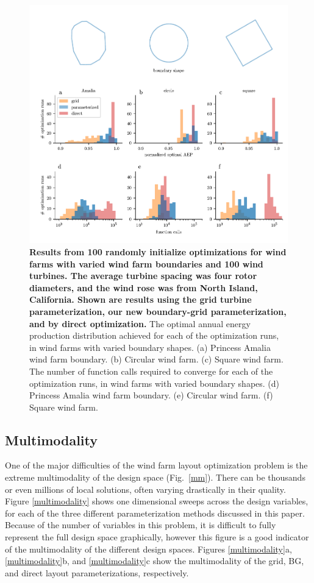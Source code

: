 \documentclass[wes, manuscript]{copernicus}
\providecommand{\DIFaddbeginFL}{} %
\providecommand{\DIFaddendFL}{} %
\providecommand{\DIFdelbeginFL}{} %
\providecommand{\DIFdelendFL}{} %
\begin{document}
\begin{figure}
\centering
\DIFdelbeginFL %
\DIFdelendFL \DIFaddbeginFL \includegraphics{paper-figures/results_boundsR1.pdf}
\DIFaddendFL \caption{\textbf{Results from 100 randomly initialize optimizations for wind farms with varied wind farm boundaries and 100 wind turbines. The average turbine spacing was four rotor diameters, and the wind rose was from North Island, California. Shown are results using the grid turbine parameterization, our new boundary-grid parameterization, and by direct optimization.} The optimal annual energy production distribution achieved for each of the optimization runs, in wind farms with varied boundary shapes.  (a) Princess Amalia wind farm boundary. (b) Circular wind farm. (c) Square wind farm. The number of function calls required to converge for each of the optimization runs, in wind farms with varied boundary shapes.  (d) Princess Amalia wind farm boundary. (e) Circular wind farm. (f) Square wind farm. }
\label{results-bounds}
\end{figure}


\subsection{Multimodality}

One of the major difficulties of the wind farm layout optimization problem is the extreme multimodality of the design space (Fig.~\ref{mm}). There can be thousands or even millions of local solutions, often varying drastically in their quality. Figure \ref{multimodality} shows one dimensional sweeps across the design variables, for each of the three different parameterization methods discussed in this paper. Because of the number of variables in this problem, it is difficult to fully represent the full design space graphically, however this figure is a good indicator of the multimodality of the different design spaces. Figures \ref{multimodality}a, \ref{multimodality}b, and \ref{multimodality}c show the multimodality of the grid, BG, and direct layout parameterizations, respectively. 
\end{document}
